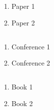\chapter*{\cvpub}


\section*{\cvpapers}
\begin{enumerate}
\item Paper 1
\item Paper 2
\end{enumerate}


\section*{\cvconf}
\begin{enumerate}
\item Conference 1
\item Conference 2
\end{enumerate}


\section*{\cvbooks}
\begin{enumerate}
\item Book 1
\item Book 2
\end{enumerate}


